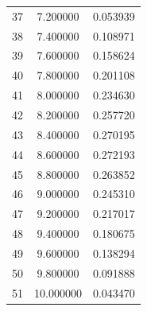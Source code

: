 \documentclass[12pt]{article}
\begin{document}
\begin{longtable}{| c | c | c |}
37 & 7.200000 & 0.053939 \\ 
38 & 7.400000 & 0.108971 \\ 
39 & 7.600000 & 0.158624 \\ 
40 & 7.800000 & 0.201108 \\ 
41 & 8.000000 & 0.234630 \\ 
42 & 8.200000 & 0.257720 \\ 
43 & 8.400000 & 0.270195 \\ 
44 & 8.600000 & 0.272193 \\ 
45 & 8.800000 & 0.263852 \\ 
46 & 9.000000 & 0.245310 \\ 
47 & 9.200000 & 0.217017 \\ 
48 & 9.400000 & 0.180675 \\ 
49 & 9.600000 & 0.138294 \\ 
50 & 9.800000 & 0.091888 \\ 
51 & 10.000000 & 0.043470 \\ 
\end{longtable}


 
\end{document}
